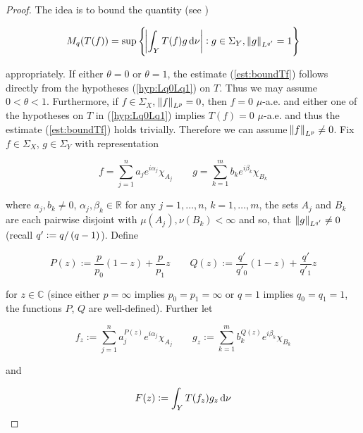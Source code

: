 \begin{proof}
	The idea is to bound the quantity (see \cite[189]{folland:real_analysis:1999})
	
	\begin{equation*}
		M_q( T(f)) = \sup\cbr{\abs{ \int_Y T(f)g \d \nu} : g \in \Sigma_Y, \norm[0]{ g}_{L^{q'}} = 1}
	\end{equation*}

	\noindent appropriately. If either $\theta = 0$ or $\theta = 1$, the estimate (\ref{est:boundTf}) follows directly from the hypotheses (\ref{hyp:Lq0Lq1}) on $T$. Thus we may assume \underline{$0 < \theta < 1$}. Furthermore, if $f \in \Sigma_X$, $\norm{ f}_{L^p} = 0$, then $f = 0$ $\mu$-a.e. and either one of the hypotheses on $T$ in (\ref{hyp:Lq0Lq1}) implies $T(f) = 0$ $\mu$-a.e. and thus the estimate (\ref{est:boundTf}) holds trivially. Therefore we can assume \underline{$\norm{f}_{L^p} \neq 0$}. Fix $f \in \Sigma_X$, $g \in \Sigma_Y$ with representation
	
\begin{equation*}
	f = \sum_{j = 1}^n a_j e^{i\alpha_j}\chi_{A_j} \qquad g = \sum_{k = 1}^m b_k e^{i\beta_k}\chi_{B_k}
\end{equation*}

\noindent where $a_j,b_k \neq 0$, $\alpha_j,\beta_k \in \mathbb{R}$ for any $j = 1,\dots,n$, $k = 1,\dots,m$, the sets $A_j$ and $B_k$ are each pairwise disjoint with $\mu( A_j),\nu(B_k) < \infty$ and so, that $\norm[0]{g}_{L^{q'}} \neq 0$ (recall $q' := q/\del[0]{ q - 1 }$). Define

\begin{equation*}
	P(z) := \frac{p}{p_0}(1 - z) + \frac{p}{p_1}z \qquad Q(z) := \frac{q'}{q'_0}(1 - z) + \frac{q'}{q'_1}z
\end{equation*}

\noindent for $z \in \mathbb{C}$ (since either $p = \infty$ implies $p_0 = p_1 = \infty$ or $q = 1$ implies $q_0 = q_1 = 1$, the functions $P$, $Q$ are well-defined). Further let
				
\begin{equation}
	f_z := \sum_{j = 1}^n a^{P(z)}_j e^{i\alpha_j}\chi_{A_j} \qquad g_z :=  \sum_{k = 1}^m b^{Q(z)}_k e^{i\beta_k}\chi_{B_k}
	\label{eq:def_fzgz}
\end{equation}
				
\noindent and 

\begin{equation}
	F(z) := \int_Y T(f_z)g_z\mathop{}\!\mathrm{d}\nu
	\label{eq:def_F}
\end{equation}


\end{proof}
